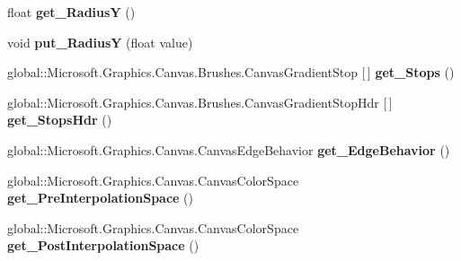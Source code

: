 \begin{DoxyCompactItemize}
float {\bfseries get\+\_\+\+RadiusY} ()
\item 
\mbox{\label{class_microsoft_1_1_graphics_1_1_canvas_1_1_brushes_1_1_canvas_radial_gradient_brush_a9d06155d0a12e95fc34c5bd238d7a02d}} 
void {\bfseries put\+\_\+\+RadiusY} (float value)
\item 
\mbox{\label{class_microsoft_1_1_graphics_1_1_canvas_1_1_brushes_1_1_canvas_radial_gradient_brush_a53f77c4a4f9752f5063e83fdef3afefe}} 
global\+::\+Microsoft.\+Graphics.\+Canvas.\+Brushes.\+Canvas\+Gradient\+Stop \mbox{[}$\,$\mbox{]} {\bfseries get\+\_\+\+Stops} ()
\item 
\mbox{\label{class_microsoft_1_1_graphics_1_1_canvas_1_1_brushes_1_1_canvas_radial_gradient_brush_a9e5998caecc47d8624cf0d050855dbd1}} 
global\+::\+Microsoft.\+Graphics.\+Canvas.\+Brushes.\+Canvas\+Gradient\+Stop\+Hdr \mbox{[}$\,$\mbox{]} {\bfseries get\+\_\+\+Stops\+Hdr} ()
\item 
\mbox{\label{class_microsoft_1_1_graphics_1_1_canvas_1_1_brushes_1_1_canvas_radial_gradient_brush_af7577b45ab358ef09d908697b38bdf10}} 
global\+::\+Microsoft.\+Graphics.\+Canvas.\+Canvas\+Edge\+Behavior {\bfseries get\+\_\+\+Edge\+Behavior} ()
\item 
\mbox{\label{class_microsoft_1_1_graphics_1_1_canvas_1_1_brushes_1_1_canvas_radial_gradient_brush_aa72bdc01bbe7dd17dd854e9bb242e6c9}} 
global\+::\+Microsoft.\+Graphics.\+Canvas.\+Canvas\+Color\+Space {\bfseries get\+\_\+\+Pre\+Interpolation\+Space} ()
\item 
\mbox{\label{class_microsoft_1_1_graphics_1_1_canvas_1_1_brushes_1_1_canvas_radial_gradient_brush_a785455e32693ce5dfe7078cfda12ceb4}} 
global\+::\+Microsoft.\+Graphics.\+Canvas.\+Canvas\+Color\+Space {\bfseries get\+\_\+\+Post\+Interpolation\+Space} ()
\item 

\end{DoxyCompactItemize}
